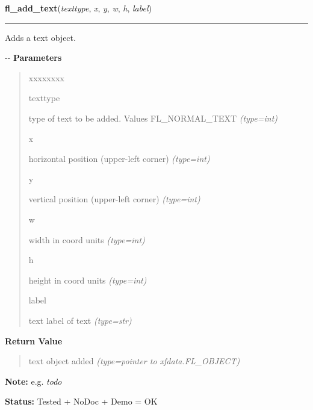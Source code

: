 \hspace{.8\funcindent}\begin{boxedminipage}{\funcwidth}

    \raggedright \textbf{fl\_add\_text}(\textit{texttype}, \textit{x}, \textit{y}, \textit{w}, \textit{h}, \textit{label})

    \vspace{-1.5ex}

    \rule{\textwidth}{0.5\fboxrule}
\setlength{\parskip}{2ex}

Adds a text object.

-{}-
\setlength{\parskip}{1ex}
      \textbf{Parameters}
      \vspace{-1ex}

      \begin{quote}
        \begin{Ventry}{xxxxxxxx}

          \item[texttype]


type of text to be added. Values FL\_NORMAL\_TEXT
            {\it (type=int)}

          \item[x]


horizontal position (upper-left corner)
            {\it (type=int)}

          \item[y]


vertical position (upper-left corner)
            {\it (type=int)}

          \item[w]


width in coord units
            {\it (type=int)}

          \item[h]


height in coord units
            {\it (type=int)}

          \item[label]


text label of text
            {\it (type=str)}

        \end{Ventry}

      \end{quote}

      \textbf{Return Value}
    \vspace{-1ex}

      \begin{quote}

text object added
      {\it (type=pointer to xfdata.FL\_OBJECT)}

      \end{quote}

\textbf{Note:} 
e.g. \emph{todo}


\textbf{Status:} 
Tested + NoDoc + Demo = OK


    \end{boxedminipage}

